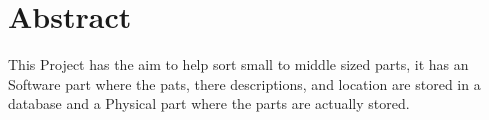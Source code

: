 \chapter*{Abstract}
\thispagestyle{fancy}
This Project has the aim to help sort small to middle sized parts, it has an Software part where the pats, there descriptions, and location are stored in a database and a Physical part where the parts are actually stored.
